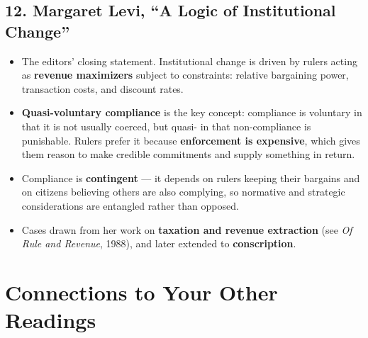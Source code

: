 \documentclass[12pt]{article}
\begin{document}
\subsection*{12. Margaret Levi, ``A Logic of Institutional Change''}
\begin{itemize}[leftmargin=*, itemsep=3pt]
    \item The editors' closing statement. Institutional change is driven by
    rulers acting as \textbf{revenue maximizers} subject to constraints:
    relative bargaining power, transaction costs, and discount rates.
    \item \textbf{Quasi-voluntary compliance} is the key concept: compliance is
    voluntary in that it is not usually coerced, but quasi- in that
    non-compliance is punishable. Rulers prefer it because \textbf{enforcement is
    expensive}, which gives them reason to make credible commitments and
    supply something in return.
    \item Compliance is \textbf{contingent} --- it depends on rulers keeping
    their bargains and on citizens believing others are also complying, so
    normative and strategic considerations are entangled rather than opposed.
    \item Cases drawn from her work on \textbf{taxation and revenue extraction}
    (see \textit{Of Rule and Revenue}, 1988), and later extended to
    \textbf{conscription}.
\end{itemize}

\section{Connections to Your Other Readings}
\end{document}
